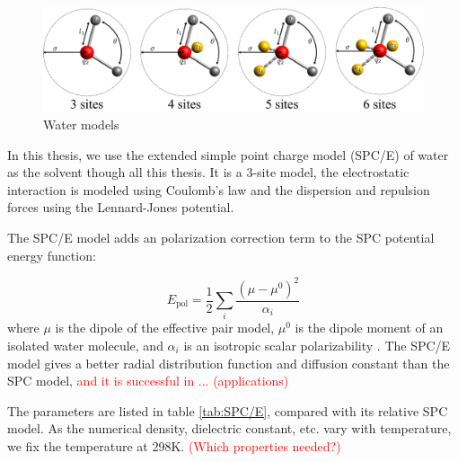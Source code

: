 \begin{figure}[h]
\begin{centering}
\includegraphics[width=0.75\columnwidth]{_figure/water}
\par\end{centering}

\caption{Water models\label{fig:Water-models}}
\end{figure}


In this thesis, we use the extended simple point charge model (SPC/E)
of water \citep{SPC/E} as the solvent though all this thesis.  It is a 3-site model, the electrostatic interaction is modeled using
Coulomb's law and the dispersion and repulsion forces using the Lennard-Jones
potential.

The SPC/E model adds an polarization correction term to the SPC potential
energy function:

\[
E_{\mathrm{pol}}=\frac{1}{2}\sum_{i}\dfrac{(\mu-\mu^{0})^{2}}{\alpha_{i}}
\]
where $\mu$ is the dipole of the effective pair model, $\mu^{0}$
is the dipole moment of an isolated water molecule, and $\alpha_{i}$
is an isotropic scalar polarizability \citep{SPC/E}. The SPC/E model
gives a better radial distribution function and diffusion constant
than the SPC model, \textcolor{red}{and it is successful in ... (applications)}

The parameters are listed in table \ref{tab:SPC/E}, compared with
its relative SPC model. As the numerical density, dielectric constant,
etc. vary with temperature, we fix the temperature at 298K. \textcolor{red}{(Which
properties needed?)}

